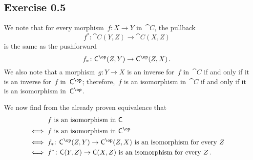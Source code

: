 \subsection{Exercise 0.5}

We note that for every morphism~$f \colon X \to Y$ in~$\cat{C}$, the pullback
\[
	f^* \colon \cat{C}(Y, Z) \to \cat{C}(X, Z)
\]
is the same as the pushforward
\[
	f_* \colon \cat{C}^{\op}(Z, Y) \to \cat{C}^{\op}(Z, X) \,.
\]
We also note that a morphism~$g \colon Y \to X$ is an inverse for~$f$ in~$\cat{C}$ if and only if it is an inverse for~$f$ in~$\cat{C}^{\op}$;
therefore,~$f$ is an isomorphism in~$\cat{C}$ if and only if it is an isomorphism in~$\cat{C}^{\op}$.

We now find from the already proven equivalence that
\begin{align*}
	{}&
	\text{$f$ is an isomorphism in~$\cat{C}$}
	\\
	\iff{}&
	\text{$f$ is an isomorphism in~$\cat{C}^{\op}$}
	\\
	\iff{}&
	\text{$f_* \colon \cat{C}^{\op}(Z, Y) \to \cat{C}^{\op}(Z, X)$ is an isomorphism for every~$Z$}
	\\
	\iff{}&
	\text{$f^* \colon \cat{C}(Y, Z) \to \cat{C}(X, Z)$ is an isomorphism for every~$Z$} \,.
\end{align*}
